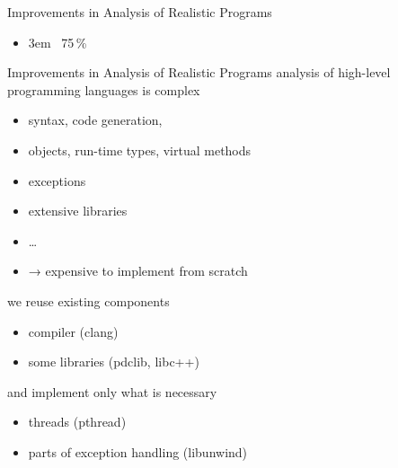 \documentclass[aspectratio=169, fi]{paradise-slide}
\newcommand{\fcite}[1]{\emergencystretch 3em{\protect\NoHyper\cite{#1}}~\fullcite{#1}}
\newenvironment{prespart}[1]{%
  \begin{frame}{}%
    \centering
      {\Large #1} \par\bigskip\bigskip%
}{%
  \end{frame}%
}
\begin{document}
\begin{prespart}{Improvements in Analysis of Realistic Programs}
  \begin{itemize}
    \item \fcite{SRB2017} \hfill 75\,\%
  \end{itemize}
\end{prespart}

\begin{frame}{Improvements in Analysis of Realistic Programs}
  analysis of high-level programming languages is complex \pause
  \begin{itemize}
    \item syntax, code generation,
    \item objects, run-time types, virtual methods
    \item exceptions
    \item extensive libraries
    \item …
    \item → expensive to implement from scratch
  \end{itemize}

  \pause\bigskip
  we reuse existing components
  \begin{itemize}
    \item compiler (clang)
    \item some libraries (pdclib, libc++)
  \end{itemize}

  and implement only what is necessary
  \begin{itemize}
    \item threads (pthread)
    \item parts of exception handling (libunwind)
  \end{itemize}
\end{frame}
\end{document}
